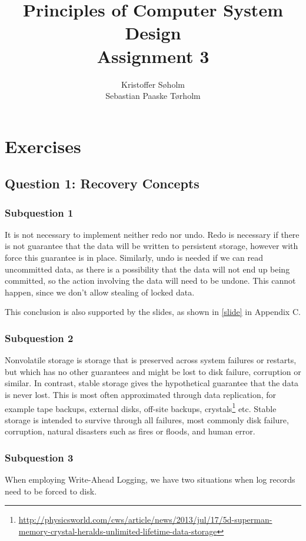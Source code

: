 \documentclass[11pt,a4paper]{article}
\title{Principles of Computer System Design\\Assignment 3}
\author{Kristoffer Søholm\\Sebastian Paaske Tørholm}
\begin{document}
\maketitle

\section{Exercises}
\subsection{Question 1: Recovery Concepts}
\subsubsection{Subquestion 1}
It is not necessary to implement neither redo nor undo. Redo is necessary if
there is not guarantee that the data will be written to persistent storage,
however with force this guarantee is in place. Similarly, undo is needed if we
can read uncommitted data, as there is a possibility that the data will not end
up being committed, so the action involving the data will need to be undone.
This cannot happen, since we don't allow stealing of locked data.

This conclusion is also supported by the slides, as shown in \autoref{slide} in
Appendix C.

\subsubsection{Subquestion 2}
Nonvolatile storage is storage that is preserved across system failures or
restarts, but which has no other guarantees and might be lost to disk failure,
corruption or similar. In contrast, stable storage gives the hypothetical
guarantee that the data is never lost. This is most often approximated through
data replication, for example tape backups, external disks, off-site backups,
crystals\footnote{\url{http://physicsworld.com/cws/article/news/2013/jul/17/5d-superman-memory-crystal-heralds-unlimited-lifetime-data-storage}} etc. 
Stable storage is intended to survive through all failures, most commonly disk
failure, corruption, natural disasters such as fires or floods, and human
error.

\subsubsection{Subquestion 3}
When employing Write-Ahead Logging, we have two situations when log records
need to be forced to disk.
\end{document}
